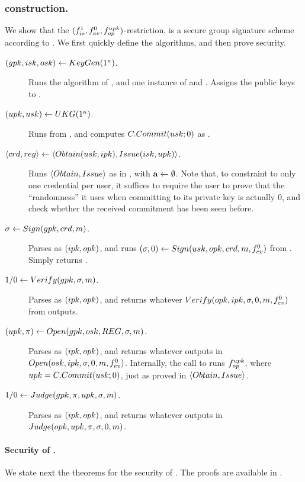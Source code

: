 \subsubsection{\CUASGS construction.} %
We show that the $(f_{is}^1,f_{ev}^0,f_{op}^{upk})$-\CUASGen restriction, is
a secure group signature scheme according to \cite{bsz05}. We first quickly
define the algorithms, and then prove security.

\begin{description}
\item[$(gpk,isk,osk) \gets KeyGen(1^\kappa)$.] Runs the \Setup algorithm
  of \CUASGen, and one instance of \IKeyGen and \OKeyGen. Assigns the public
  keys to \gpk.
\item[$(upk,usk) \gets UKG(1^\kappa)$.] Runs \UKeyGen from \CUASGen, and
  computes $C.Commit(usk;0)$ as \upk.
\item[$\langle crd,reg \rangle \gets
  \langle Obtain(usk,ipk),Issue(isk,upk)\rangle$.] Runs $\langle Obtain,
  Issue\rangle$ as in \CUASGen, with $\mathbf{a} \gets \emptyset$. Note that, to
  constraint to only one credential per user, it suffices to require the user
  to prove that the ``randomness'' it uses when committing to its private key
  is actually $0$, and check whether the received commitment has been seen
  before.
\item[$\sigma \gets Sign(gpk,crd,m)$.] Parses \gpk as $(ipk,opk)$, and
  runs $(\sigma,0) \gets Sign(usk,opk,crd,m,f_{ev}^0)$ from \CUASGen.
  Simply returns \sig.
\item[$1/0 \gets Verify(gpk,\sigma,m)$.] Parses \gpk as $(ipk,opk)$, and
  returns whatever $Verify(opk,ipk,\sigma,0,m,f_{ev}^0)$ from \CUASGen
  outputs.
\item[$(\upk,\pi) \gets \Open(\gpk,\osk,\trans,\sig,\msg)$.] Parses \gpk as
  $(ipk,opk)$, and returns whatever \CUASGen outputs in $Open(osk,ipk,\sigma,
  0,m,f_{ev}^0)$. Internally, the call to \Open runs
  $f_{op}^{upk}$, where $upk = C.Commit(usk;0)$, just as proved in $\langle
  Obtain,Issue\rangle$.
\item[$1/0 \gets Judge(gpk,\pi,upk,\sigma,m)$.] Parses \gpk as $(ipk,
  opk)$, and returns whatever \CUASGen outputs in $Judge(opk,upk,\pi,\sigma,
  0,m)$.
\end{description}

\paragraph{Security of \CUASGS.} %
We state next the theorems for the security of \CUASGS. The proofs are available
in .

